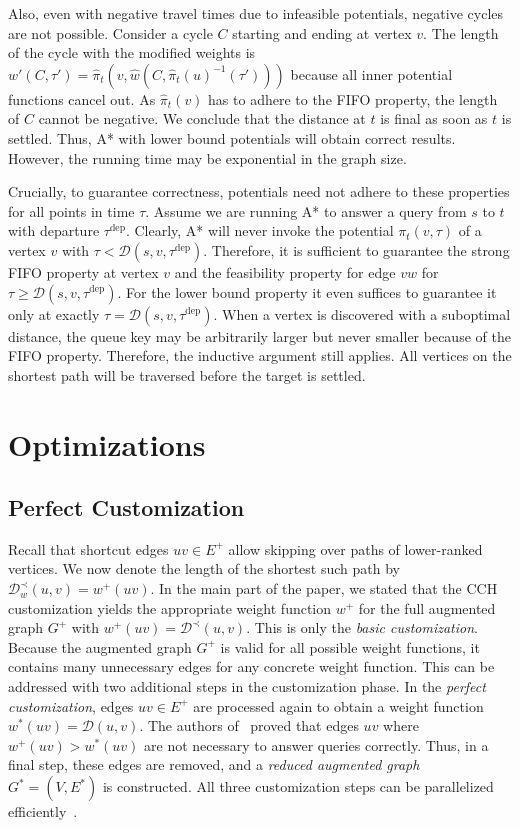 \documentclass[a4paper,UKenglish,cleveref, autoref, thm-restate]{lipics-v2021}
\newcommand*{\dist}{\mathcal{D}}
\newcommand*{\tdep}{\tau^{\operatorname{dep}}}
\begin{document}
Also, even with negative travel times due to infeasible potentials, negative cycles are not possible.
Consider a cycle $C$ starting and ending at vertex $v$.
The length of the cycle with the modified weights is $w'(C, \tau') = \hat{\pi}_t(v, \hat{w}(C, \hat{\pi}_t(u)^{-1}(\tau')))$ because all inner potential functions cancel out.
As $\hat{\pi}_t(v)$ has to adhere to the FIFO property, the length of $C$ cannot be negative.
We conclude that the distance at $t$ is final as soon as $t$ is settled.
Thus, A* with lower bound potentials will obtain correct results.
However, the running time may be exponential in the graph size.

Crucially, to guarantee correctness, potentials need not adhere to these properties for all points in time $\tau$.
Assume we are running A* to answer a query from $s$ to $t$ with departure $\tdep$.
Clearly, A* will never invoke the potential $\pi_t(v, \tau)$ of a vertex $v$ with $\tau < \dist(s,v,\tdep)$.
Therefore, it is sufficient to guarantee the strong FIFO property at vertex $v$ and the feasibility property for edge $vw$ for $\tau \geq \dist(s,v,\tdep)$.
For the lower bound property it even suffices to guarantee it only at exactly $\tau = \dist(s,v,\tdep)$.
When a vertex is discovered with a suboptimal distance, the queue key may be arbitrarily larger but never smaller because of the FIFO property.
Therefore, the inductive argument still applies.
All vertices on the shortest path will be traversed before the target is settled.

\section{Optimizations}\label{sec:appendix:optimizations}

\subsection{Perfect Customization}

Recall that shortcut edges $uv \in E^+$ allow skipping over paths of lower-ranked vertices.
We now denote the length of the shortest such path by $\dist^{\prec}_w(u,v) = w^+(uv)$.
In the main part of the paper, we stated that the CCH customization yields the appropriate weight function $w^+$ for the full augmented graph $G^+$ with $w^+(uv) = \dist^{\prec}(u,v)$.
This is only the \emph{basic customization}.
Because the augmented graph $G^+$ is valid for all possible weight functions, it contains many unnecessary edges for any concrete weight function.
This can be addressed with two additional steps in the customization phase.
In the \emph{perfect customization}, edges $uv \in E^+$ are processed again to obtain a weight function $w^*(uv) = \dist(u,v)$.
The authors of~\cite{dsw-cch-15} proved that edges $uv$ where $w^+(uv) > w^*(uv)$ are not necessary to answer queries correctly.
Thus, in a final step, these edges are removed, and a \emph{reduced augmented graph} $G^*=(V, E^*)$ is constructed.
All three customization steps can be parallelized efficiently~\cite{bsw-rttau-19}.
\end{document}
